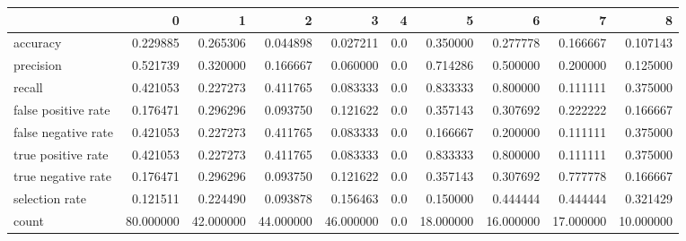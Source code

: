 \begin{tabular}{lrrrrrrrrr}
\toprule
{} &          0 &          1 &          2 &          3 &    4 &          5 &          6 &          7 &          8 \\
\midrule
accuracy            &   0.229885 &   0.265306 &   0.044898 &   0.027211 &  0.0 &   0.350000 &   0.277778 &   0.166667 &   0.107143 \\
precision           &   0.521739 &   0.320000 &   0.166667 &   0.060000 &  0.0 &   0.714286 &   0.500000 &   0.200000 &   0.125000 \\
recall              &   0.421053 &   0.227273 &   0.411765 &   0.083333 &  0.0 &   0.833333 &   0.800000 &   0.111111 &   0.375000 \\
false positive rate &   0.176471 &   0.296296 &   0.093750 &   0.121622 &  0.0 &   0.357143 &   0.307692 &   0.222222 &   0.166667 \\
false negative rate &   0.421053 &   0.227273 &   0.411765 &   0.083333 &  0.0 &   0.166667 &   0.200000 &   0.111111 &   0.375000 \\
true positive rate  &   0.421053 &   0.227273 &   0.411765 &   0.083333 &  0.0 &   0.833333 &   0.800000 &   0.111111 &   0.375000 \\
true negative rate  &   0.176471 &   0.296296 &   0.093750 &   0.121622 &  0.0 &   0.357143 &   0.307692 &   0.777778 &   0.166667 \\
selection rate      &   0.121511 &   0.224490 &   0.093878 &   0.156463 &  0.0 &   0.150000 &   0.444444 &   0.444444 &   0.321429 \\
count               &  80.000000 &  42.000000 &  44.000000 &  46.000000 &  0.0 &  18.000000 &  16.000000 &  17.000000 &  10.000000 \\
\bottomrule
\end{tabular}
